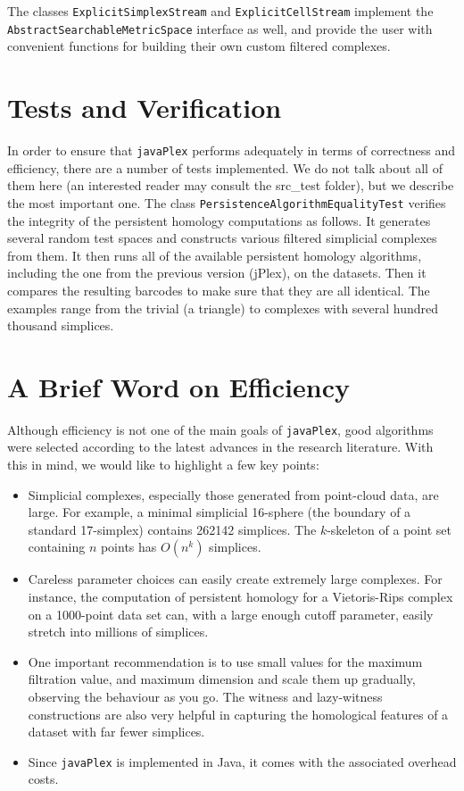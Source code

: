 \documentclass[11pt]{amsart}
\newcommand\javaPlex{\texttt{javaPlex}\xspace}
\begin{document}
The classes  \texttt{ExplicitSimplexStream} and  \texttt{ExplicitCellStream} implement the  \texttt{Abstract\-Searchable\-Metric\-Space} interface as well, and provide the user with convenient functions for building their own custom filtered complexes.

\section{Tests and Verification}

In order to ensure that \javaPlex performs adequately in terms of correctness and efficiency, there are a number of tests implemented. We do not talk about all of them here (an interested reader may consult the src\_test folder), but we describe the most important one. The class  \texttt{Persistence\-Algorithm\-Equality\-Test} verifies the integrity of the persistent homology computations as follows. It generates several random test spaces and constructs various filtered simplicial complexes from them. It then runs all of the available persistent homology algorithms, including the one from the previous version (jPlex), on the datasets. Then it compares the resulting barcodes to make sure that they are all identical. The examples range from the trivial (a triangle) to complexes with several hundred thousand simplices.

\section{A Brief Word on Efficiency}

Although efficiency is not one of the main goals of \javaPlex, good algorithms were selected according to the latest advances in the research literature. With this in mind, we would like to highlight a few key points:

\begin{itemize}
\item Simplicial complexes, especially those generated from point-cloud data, are large. For example, a minimal simplicial 16-sphere (the boundary of a standard 17-simplex) contains 262142 simplices. The $k$-skeleton of a point set containing $n$ points has $O(n^k)$ simplices.
\item Careless parameter choices can easily create extremely large complexes. For instance, the computation of persistent homology for a Vietoris-Rips complex on a 1000-point data set can, with a large enough cutoff parameter, easily stretch into millions of simplices.
\item One important recommendation is to use small values for the maximum filtration value, and maximum dimension and scale them up gradually, observing the behaviour as you go. The witness and lazy-witness constructions are also very helpful in capturing the homological features of a dataset with far fewer simplices.
\item Since \javaPlex is implemented in Java, it comes with the associated overhead costs. 
\end{itemize}
\end{document}
